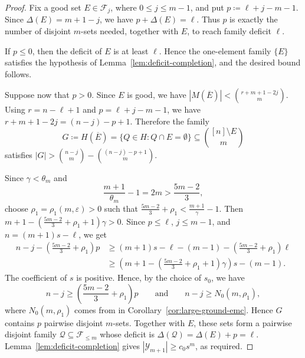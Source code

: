 \documentclass[10pt,a4paper]{article}
\numberwithin{equation}{section}
\theoremstyle{definition}
\newtheorem{claim}[claim]{Claim}
\newcommand{\F}{\mathcal F}
\newcommand{\Y}{\mathcal Y}
\begin{document}
\begin{proof}
    Fix a good set \(E\in\F_j\), where \(0\le j\le m-1\), and put
    \(p\coloneqq \ell+j-m-1.\)
    Since \(\Delta(E)=m+1-j\), we have $p+\Delta(E)=\ell$.
    Thus $p$ is exactly the number of disjoint $m$-sets needed, together with
    $E$, to reach family deficit $\ell$.

    If \(p\le0\), then the deficit of $E$ is at least \(\ell\).
    Hence the one-element family \(\{E\}\) satisfies the hypothesis of
    Lemma~\ref{lem:deficit-completion}, and the desired bound follows.

    Suppose now that \(p>0\).
    Since \(E\) is good, we have
    \(|M(\overline E)|<\binom{r+m+1-2j}{m}.\)
    Using \(r=n-\ell+1\) and \(p=\ell+j-m-1\), we have
    \(r+m+1-2j=(n-j)-p+1.\)
    Therefore the family
    \[
        G\coloneqq H(\overline E)
        =
        \{Q\in H:Q\cap E=\emptyset\}
        \subseteq\binom{[n]\setminus E}{m}
    \]
    satisfies
    \(|G|> \binom{n-j}{m}-\binom{(n-j)-p+1}{m}.\)

    Since $\gamma<\theta_m$ and
    \[
        \frac{m+1}{\theta_m}-1=2m>\frac{5m-2}{3},
    \]
    choose \(\rho_1=\rho_1(m,\varepsilon)>0\) such that
    \(\frac{5m-2}{3}+\rho_1<\frac{m+1}{\gamma}-1.\)
    Then
    \(m+1-\left(\frac{5m-2}{3}+\rho_1+1\right)\gamma>0.\)
    Since \(p\le\ell\), \(j\le m-1\), and \(n=(m+1)s-\ell\), we get
    \[
        \begin{aligned}
            n-j-\left(\frac{5m-2}{3}+\rho_1\right)p
             & \ge
            (m+1)s-\ell-(m-1)
            -\left(\frac{5m-2}{3}+\rho_1\right)\ell \\
             & \ge
            \left(m+1-\left(\frac{5m-2}{3}+\rho_1+1\right)\gamma\right)s
            -(m-1).
        \end{aligned}
    \]
    The coefficient of \(s\) is positive.  Hence, by the choice of \(s_0\), we have
    \[
        n-j\ge \left(\frac{5m-2}{3}+\rho_1\right)p
        \qquad\text{and}\qquad
        n-j\ge N_0(m,\rho_1),
    \]
    where \(N_0(m,\rho_1)\) comes from in Corollary~\ref{cor:large-ground-emc}.
    Hence $G$ contains $p$ pairwise disjoint $m$-sets.
    Together with \(E\), these sets form a pairwise disjoint family
    \(\mathcal Q\subseteq \F_{\le m}\)
    whose deficit is $\Delta(\mathcal Q)=\Delta(E)+p=\ell$.
    Lemma~\ref{lem:deficit-completion} gives $|\Y_{m+1}|\ge c_0s^m$, as required.
\end{proof}
\end{document}
